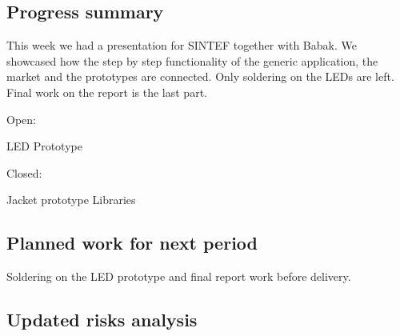 \subsection{Progress summary}

This week we had a presentation for SINTEF together with Babak. We showcased how the step by step functionality of the generic application, the market and the prototypes are connected.
Only soldering on the LEDs are left. Final work on the report is the last part.

Open:

LED Prototype

Closed:

Jacket prototype
Libraries

\subsection{Planned work for next period}

Soldering on the LED prototype and final report work before delivery.

\subsection{Updated risks analysis}
